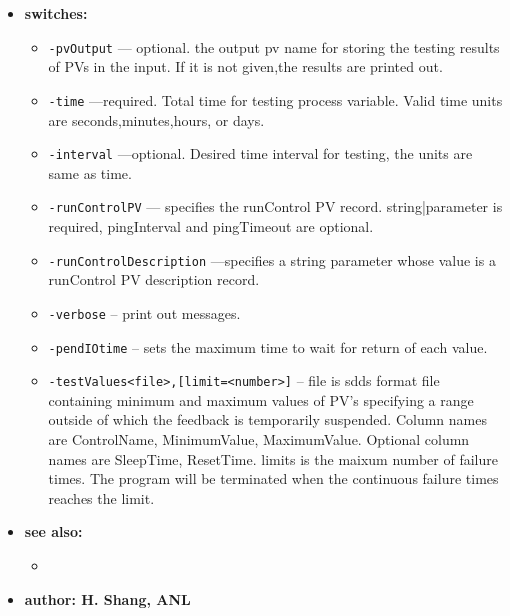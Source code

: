 \begin{itemize}
%
\item {\bf switches:}
%
%
    \begin{itemize}
%
%
        \item {\tt -pvOutput} --- optional. the output pv name for storing the testing results
               of PVs in the input. If it is not given,the results are printed out.
        \item {\tt -time} ---required. Total time for testing process variable.
               Valid time units are seconds,minutes,hours, or days. 
         \item {\tt -interval} ---optional. Desired time interval for testing, the units are same as time.
        \item {\tt -runControlPV} --- specifies the runControl PV record. string|parameter is required,
                pingInterval and pingTimeout are optional.
        \item {\tt -runControlDescription} ---specifies a string parameter whose value is a runControl
                PV description record.
        \item {\tt -verbose} -- print out messages. 
        \item {\tt -pendIOtime} -- sets the maximum time to wait for return of each value.
        \item {\tt -testValues<file>,[limit=<number>]} --
           file is sdds format file containing minimum and maximum values of PV's specifying
           a range outside of which the feedback is temporarily suspended. Column names are
           ControlName, MinimumValue, MaximumValue. Optional column names are SleepTime, 
           ResetTime. limits is the maixum number of failure times. The program will be
           terminated when the continuous failure times reaches the limit.
    \end{itemize}
\item {\bf see also:}
    \begin{itemize}
%
%
    \item {}
    \end{itemize}
%
%
\item {\bf author: H. Shang, ANL}
\end{itemize}
